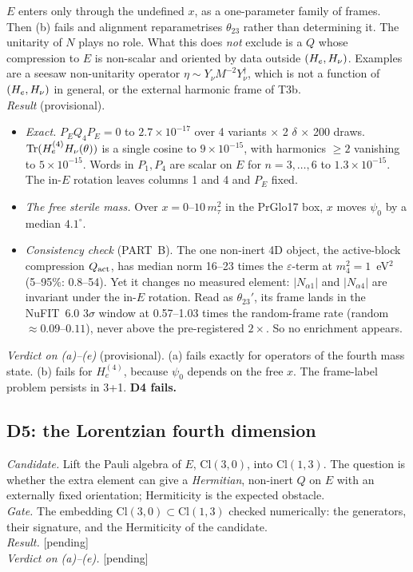 $E$ enters only through the undefined $x$, as a one-parameter family of frames. Then (b) fails and
alignment reparametrises $\theta_{23}$ rather than determining it. The unitarity of $N$ plays no
role. What this does \emph{not} exclude is a $Q$ whose compression to $E$ is non-scalar and oriented
by data outside $(H_e,H_\nu)$. Examples are a seesaw non-unitarity operator
$\eta\sim Y_\nu M^{-2}Y_\nu^\dagger$, which is not a function of $(H_e,H_\nu)$ in general, or the
external harmonic frame of T3b.\\
\emph{Result} (provisional).
\begin{itemize}
\item \emph{Exact.} $P_EQ_4P_E=0$ to $2.7\times10^{-17}$ over 4 variants $\times$ 2 $\delta$ $\times$
  200 draws. $\operatorname{Tr}(H_e^{(4)}H_\nu(\theta))$ is a single cosine to $9\times10^{-15}$, with harmonics
  $\ge2$ vanishing to $5\times10^{-15}$. Words in $P_1,P_4$ are scalar on $E$ for $n=3,\dots,6$ to
  $1.3\times10^{-15}$. The in-$E$ rotation leaves columns 1 and 4 and $P_E$ fixed.
\item \emph{The free sterile mass.} Over $x=0$--$10\,m_\tau^2$ in the PrGlo17 box, $x$ moves $\psi_0$
  by a median $4.1^\circ$.
\item \emph{Consistency check} (PART~B). The one non-inert 4D object, the active-block compression
  $Q_{\rm act}$, has median norm 16--23 times the $\varepsilon$-term at $m_4^2=1$~eV$^2$ (5--95\%:
  0.8--54). Yet it changes no measured element: $|N_{\alpha1}|$ and $|N_{\alpha4}|$ are invariant under
  the in-$E$ rotation. Read as $\theta_{23}'$, its frame lands in the NuFIT~6.0 $3\sigma$ window at
  0.57--1.03 times the random-frame rate (random $\approx0.09$--$0.11$), never above the
  pre-registered $2\times$. So no enrichment appears.
\end{itemize}
\emph{Verdict on (a)--(e)} (provisional). (a) fails exactly for operators of the fourth mass state.
(b) fails for $H_e^{(4)}$, because $\psi_0$ depends on the free $x$. The frame-label problem persists
in 3+1. \textbf{D4 fails.}

\subsection{D5: the Lorentzian fourth dimension}\label{sec:D5}
\emph{Candidate.} Lift the Pauli algebra of $E$, $\mathrm{Cl}(3,0)$, into $\mathrm{Cl}(1,3)$. The
question is whether the extra element can give a \emph{Hermitian}, non-inert $Q$ on $E$ with an
externally fixed orientation; Hermiticity is the expected obstacle.\\
\emph{Gate.} The embedding $\mathrm{Cl}(3,0)\subset\mathrm{Cl}(1,3)$ checked numerically: the
generators, their signature, and the Hermiticity of the candidate.\\
\emph{Result.} [pending]\\
\emph{Verdict on (a)--(e).} [pending]


